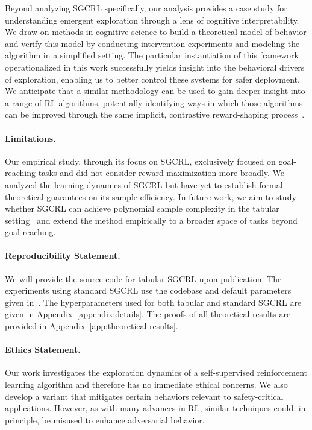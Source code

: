 \documentclass{article}
\begin{document}
Beyond analyzing SGCRL specifically, our analysis provides a  case study for understanding emergent exploration through a lens of cognitive interpretability. We draw on methods in cognitive science to build a theoretical model of behavior and verify this model by conducting intervention experiments and modeling the algorithm in a simplified setting. The particular instantiation of this framework operationalized in this work successfully yields insight into the behavioral drivers of exploration, enabling us to better control these systems for safer deployment. We anticipate that a similar methodology can be used to gain deeper insight into a range of RL algorithms, potentially identifying ways in which those algorithms can be improved through the same implicit, contrastive reward-shaping process~\citep{asmuth2008potential}. 

\paragraph{Limitations.} 
Our empirical study, through its focus on SGCRL, exclusively focused on goal-reaching tasks and did not consider reward maximization more broadly. We analyzed the learning dynamics of SGCRL but have yet to establish formal theoretical guarantees on its sample efficiency. In future work, we aim to study whether SGCRL can achieve polynomial sample complexity in the tabular setting~\citep{kakade2003sample,strehl2009reinforcement} and extend the method empirically to a broader space of tasks beyond goal reaching. 

\paragraph{Reproducibility Statement.}
We will provide the source code for tabular SGCRL upon publication. The experiments using standard SGCRL use the codebase and default parameters given in~\citep{liu2025a}. The hyperparameters used for both tabular and standard SGCRL are given in Appendix~\ref{appendix:details}. The proofs of all theoretical results are provided in Appendix~\ref{app:theoretical-results}.


\paragraph{Ethics Statement.}
Our work investigates the exploration dynamics of a self-supervised reinforcement learning algorithm and therefore has no immediate ethical concerns. We also develop a variant that mitigates certain behaviors relevant to safety-critical applications. However, as with many advances in RL, similar techniques could, in principle, be misused to enhance adversarial behavior.
\end{document}
